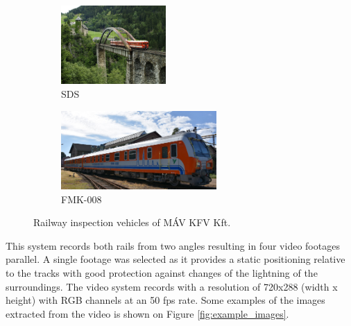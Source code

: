 \begin{figure}[!ht]
    \centering
    \begin{subfigure}{0.45\textwidth}
        \centering
        \includegraphics[height=3cm]{./tex_images/sds.jpg}
        \caption*{SDS}
    \end{subfigure}
    \begin{subfigure}{0.45\textwidth}
        \centering
        \includegraphics[height=3cm]{./tex_images/FMK008.jpg}
        \caption*{FMK-008}
    \end{subfigure}
    \caption{Railway inspection vehicles of MÁV KFV Kft.}
    \label{fig:vehicles}
\end{figure}

This system records both rails from two angles resulting in four video footages parallel.
A single footage was selected as it provides a static positioning relative to the tracks with good
protection against changes of the lightning of the surroundings.
The video system records with a resolution of 720x288 (width x height) with RGB channels
at an 50 fps rate.
Some examples of the images extracted from the video is shown on Figure \ref{fig:example_images}.

